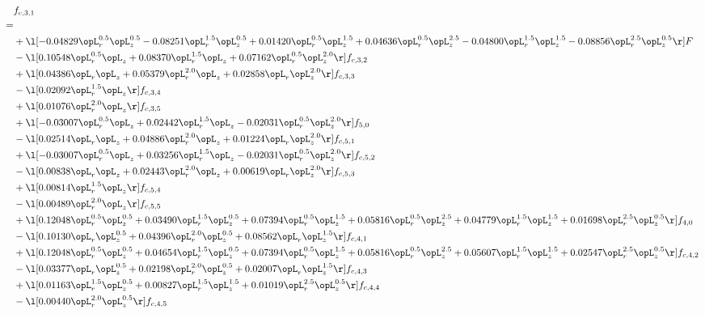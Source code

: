 \begin{alignat}{2} 
\label{eq:f_31_2} 
& f_{c,3,1} \nonumber \\ 
 = \\ 
& + \l[  -0.04829 \opL_r^{0.5} \opL_z^{0.5}   -0.08251 \opL_r^{1.5} \opL_z^{0.5} +  0.01420 \opL_r^{0.5} \opL_z^{1.5} +  0.04636 \opL_r^{0.5} \opL_z^{2.5}   -0.04800 \opL_r^{1.5} \opL_z^{1.5}   -0.08856 \opL_r^{2.5} \opL_z^{0.5}  \r] F \nonumber \\ 
& - \l[  0.10548 \opL_r^{0.5} \opL_z +  0.08370 \opL_r^{1.5} \opL_z +  0.07162 \opL_r^{0.5} \opL_z^{2.0}  \r] f_{c,3,2} \nonumber \\ 
& + \l[  0.04386 \opL_r \opL_z +  0.05379 \opL_r^{2.0} \opL_z +  0.02858 \opL_r \opL_z^{2.0}  \r] f_{c,3,3} \nonumber \\ 
& - \l[  0.02092 \opL_r^{1.5} \opL_z  \r] f_{c,3,4} \nonumber \\ 
& + \l[  0.01076 \opL_r^{2.0} \opL_z  \r] f_{c,3,5} \nonumber \\ 
& + \l[  -0.03007 \opL_r^{0.5} \opL_z +  0.02442 \opL_r^{1.5} \opL_z   -0.02031 \opL_r^{0.5} \opL_z^{2.0}  \r] f_{5,0} \nonumber \\ 
& - \l[  0.02514 \opL_r \opL_z +  0.04886 \opL_r^{2.0} \opL_z +  0.01224 \opL_r \opL_z^{2.0}  \r] f_{c,5,1} \nonumber \\ 
& + \l[  -0.03007 \opL_r^{0.5} \opL_z +  0.03256 \opL_r^{1.5} \opL_z   -0.02031 \opL_r^{0.5} \opL_z^{2.0}  \r] f_{c,5,2} \nonumber \\ 
& - \l[  0.00838 \opL_r \opL_z +  0.02443 \opL_r^{2.0} \opL_z +  0.00619 \opL_r \opL_z^{2.0}  \r] f_{c,5,3} \nonumber \\ 
& + \l[  0.00814 \opL_r^{1.5} \opL_z  \r] f_{c,5,4} \nonumber \\ 
& - \l[  0.00489 \opL_r^{2.0} \opL_z  \r] f_{c,5,5} \nonumber \\ 
& + \l[  0.12048 \opL_r^{0.5} \opL_z^{0.5} +  0.03490 \opL_r^{1.5} \opL_z^{0.5} +  0.07394 \opL_r^{0.5} \opL_z^{1.5} +  0.05816 \opL_r^{0.5} \opL_z^{2.5} +  0.04779 \opL_r^{1.5} \opL_z^{1.5} +  0.01698 \opL_r^{2.5} \opL_z^{0.5}  \r] f_{4,0} \nonumber \\ 
& - \l[  0.10130 \opL_r \opL_z^{0.5} +  0.04396 \opL_r^{2.0} \opL_z^{0.5} +  0.08562 \opL_r \opL_z^{1.5}  \r] f_{c,4,1} \nonumber \\ 
& + \l[  0.12048 \opL_r^{0.5} \opL_z^{0.5} +  0.04654 \opL_r^{1.5} \opL_z^{0.5} +  0.07394 \opL_r^{0.5} \opL_z^{1.5} +  0.05816 \opL_r^{0.5} \opL_z^{2.5} +  0.05607 \opL_r^{1.5} \opL_z^{1.5} +  0.02547 \opL_r^{2.5} \opL_z^{0.5}  \r] f_{c,4,2} \nonumber \\ 
& - \l[  0.03377 \opL_r \opL_z^{0.5} +  0.02198 \opL_r^{2.0} \opL_z^{0.5} +  0.02007 \opL_r \opL_z^{1.5}  \r] f_{c,4,3} \nonumber \\ 
& + \l[  0.01163 \opL_r^{1.5} \opL_z^{0.5} +  0.00827 \opL_r^{1.5} \opL_z^{1.5} +  0.01019 \opL_r^{2.5} \opL_z^{0.5}  \r] f_{c,4,4} \nonumber \\ 
& - \l[  0.00440 \opL_r^{2.0} \opL_z^{0.5}  \r] f_{c,4,5} \nonumber \\ 
\end{alignat} 


